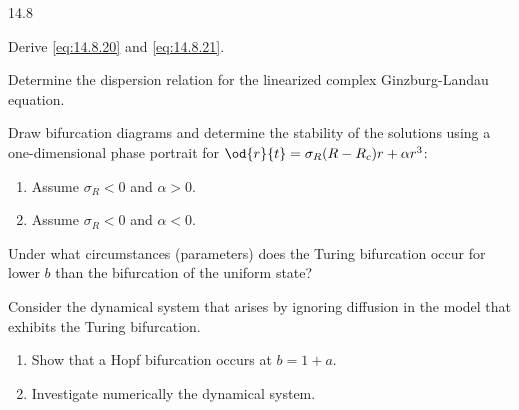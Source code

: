 \begin{exercises}{14.8}
\item Derive \eqref{eq:14.8.20} and \eqref{eq:14.8.21}.

\item Determine the dispersion relation for the linearized complex Ginzburg-Landau equation.

\item Draw bifurcation diagrams and determine the stability of the solutions using a one-dimensional phase portrait for $\od{r}{t} = \sigma_R(R - R_c)r + \alpha r^3$:
\begin{enumerate}
\item[(a)] Assume $\sigma_R < 0$ and $\alpha > 0$.
\item[(b)] Assume $\sigma_R < 0$ and $\alpha < 0$.
\end{enumerate}

\item Under what circumstances (parameters) does the Turing bifurcation occur for lower $b$ than the bifurcation of the uniform state?

\item Consider the dynamical system that arises by ignoring diffusion in the model that exhibits the Turing bifurcation.
\begin{enumerate}
\item[(a)] Show that a Hopf bifurcation occurs at $b = 1 + a$.
\item[(b)] Investigate numerically the dynamical system.
\end{enumerate}
\end{exercises}
